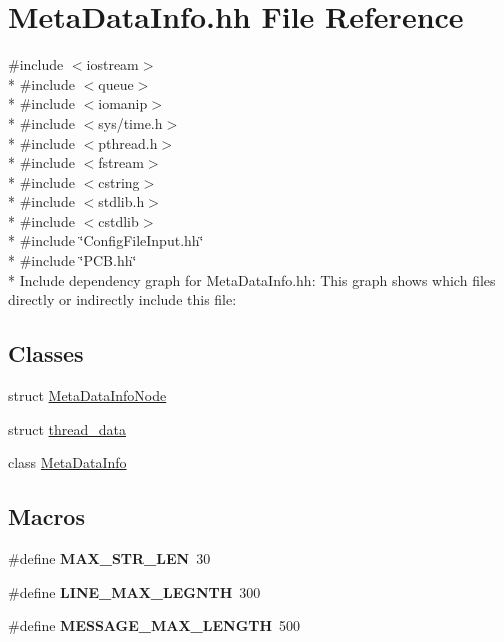 \hypertarget{_meta_data_info_8hh}{}\section{Meta\+Data\+Info.\+hh File Reference}
\label{_meta_data_info_8hh}
{\ttfamily \#include $<$iostream$>$}\\*
{\ttfamily \#include $<$queue$>$}\\*
{\ttfamily \#include $<$iomanip$>$}\\*
{\ttfamily \#include $<$sys/time.\+h$>$}\\*
{\ttfamily \#include $<$pthread.\+h$>$}\\*
{\ttfamily \#include $<$fstream$>$}\\*
{\ttfamily \#include $<$cstring$>$}\\*
{\ttfamily \#include $<$stdlib.\+h$>$}\\*
{\ttfamily \#include $<$cstdlib$>$}\\*
{\ttfamily \#include \char`\"{}Config\+File\+Input.\+hh\char`\"{}}\\*
{\ttfamily \#include \char`\"{}P\+C\+B.\+hh\char`\"{}}\\*
Include dependency graph for Meta\+Data\+Info.\+hh\+:
This graph shows which files directly or indirectly include this file\+:
\subsection*{Classes}
\begin{DoxyCompactItemize}
\item 
struct \hyperlink{struct_meta_data_info_node}{Meta\+Data\+Info\+Node}
\item 
struct \hyperlink{structthread__data}{thread\+\_\+data}
\item 
class \hyperlink{class_meta_data_info}{Meta\+Data\+Info}
\end{DoxyCompactItemize}
\subsection*{Macros}
\begin{DoxyCompactItemize}
\item 
\#define {\bfseries M\+A\+X\+\_\+\+S\+T\+R\+\_\+\+L\+EN}~30\hypertarget{_meta_data_info_8hh_a58ce36916c399104e18d32ff090f21c6}{}\label{_meta_data_info_8hh_a58ce36916c399104e18d32ff090f21c6}

\item 
\#define {\bfseries L\+I\+N\+E\+\_\+\+M\+A\+X\+\_\+\+L\+E\+G\+N\+TH}~300\hypertarget{_meta_data_info_8hh_a828e76c4673f1a0757e0380a5cf50325}{}\label{_meta_data_info_8hh_a828e76c4673f1a0757e0380a5cf50325}

\item 
\#define {\bfseries M\+E\+S\+S\+A\+G\+E\+\_\+\+M\+A\+X\+\_\+\+L\+E\+N\+G\+TH}~500\hypertarget{_meta_data_info_8hh_ad266dc7dec611fa99e4f2737d85deb17}{}\label{_meta_data_info_8hh_ad266dc7dec611fa99e4f2737d85deb17}

\end{DoxyCompactItemize}
